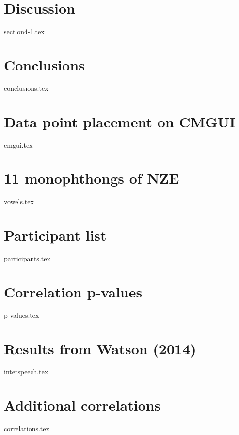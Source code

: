 \documentclass[a4paper,12pt,table,xcdraw]{book}
\begin{document}
\chapter{Discussion}
{section4-1.tex}

\chapter{Conclusions}
{conclusions.tex}

\begin{appendices}

\chapter{Data point placement on CMGUI} \label{ch:cmgui}
{cmgui.tex}

\chapter{11 monophthongs of NZE} \label{ch:monophthongs}
{vowels.tex}

\chapter{Participant list} \label{ch:participants-list}
{participants.tex}

\chapter{Correlation p-values} \label{ch:pvalues}
{p-values.tex}

\chapter{Results from Watson (2014)} \label{ch:interspeech}
{interspeech.tex}

\chapter{Additional correlations} \label{ch:correlations}
{correlations.tex}

\end{appendices}

\backmatter

\renewcommand\bibname{References}


\end{document}
